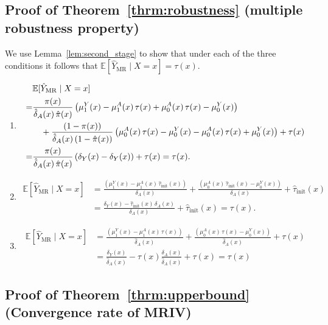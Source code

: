 \documentclass{article} %
\newcommand{\E}{\mathbb{E}}
\newcommand{\frameworkname}{MRIV\xspace}
\theoremstyle{definition}
\theoremstyle{plain}
\begin{document}
\subsection{Proof of Theorem~\ref*{thrm:robustness} (multiple robustness property)}

We use Lemma~\ref{lem:second_stage} to show that under each of the three conditions it follows that $\E[\hat{Y}_{\mathrm{MR}} \mid X=x] = \tau(x)$.
\begin{enumerate}
\item \begin{align}
    &\E[\hat{Y}_{\mathrm{\mathrm{MR}}} \mid X=x] \\ =&  \frac{\pi(x)}{\hat{\delta}_A(x) \, \hat{\pi}(x)} \left(\mu_1^Y(x) - \mu_1^A(x) \, \tau(x) + \mu_0^A(x) \, \tau(x) - \mu_0^Y (x)\right) \notag \\
   & \quad + \frac{(1-\pi(x))}{\hat{\delta}_A(x) \, (1 - \hat{\pi}(x))} \left(\mu_0^A(x) \, \tau(x) -\mu_0^Y(x)  - \mu_0^A(x) \, \tau(x) + \mu_0^Y (x)\right)
    + \tau(x) \\
    =& \frac{\pi(x)}{\hat{\delta}_A(x) \, \hat{\pi}(x)} \left(\delta_Y(x) - \delta_Y(x) \right) + \tau(x) = \tau(x).
    \end{align}
\item \begin{align}\E[\hat{Y}_{\mathrm{\mathrm{MR}}} \mid X=x] &= \frac{\left(\mu_1^Y(x) - \mu_1^A(x) \, \hat{\tau}_{\mathrm{init}}(x)\right)}{\delta_A(x)}
   + \frac{\left(\mu_0^A(x) \, \hat{\tau}_{\mathrm{init}}(x) -\mu_0^Y(x) \right)}{\delta_A(x)} + \hat{\tau}_{\mathrm{init}}(x)  \\ &= \frac{\delta_Y(x) - \hat{\tau}_{\mathrm{init}}(x) \, \delta_A(x)}{\delta_A(x)} + \hat{\tau}_{\mathrm{init}}(x) = \tau(x).
   \end{align}
  
\item \begin{align}\E[\hat{Y}_{\mathrm{\mathrm{MR}}} \mid X=x] &= \frac{\left(\mu_1^Y(x) - \mu_1^A(x) \, \tau(x)\right)}{\hat{\delta}_A(x)}
   + \frac{\left(\mu_0^A(x) \, \tau(x) -\mu_0^Y(x) \right)}{\hat{\delta}_A(x)} + \tau(x) \\ &= \frac{\delta_Y(x)}{\hat{\delta}_A(x)} - \tau(x) \frac{\delta_A(x)}{\hat{\delta}_A(x)} + \tau(x) = \tau(x)
   \end{align}
\end{enumerate}

\subsection{Proof of Theorem~\ref*{thrm:upperbound} (Convergence rate of \frameworkname)}
\end{document}

